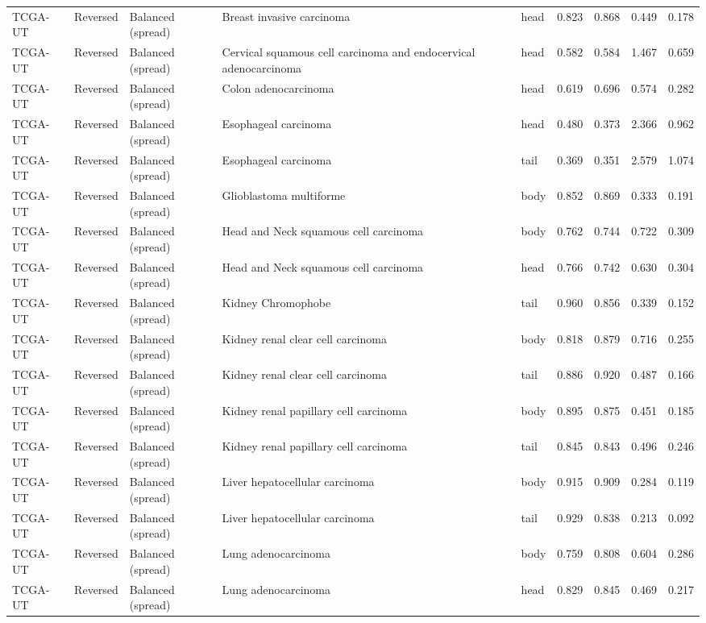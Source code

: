 \begin{longtable}{lllllrrrr}
TCGA-UT & Reversed & Balanced (spread) & Breast invasive carcinoma & head & 0.823 & 0.868 & 0.449 & 0.178 \\
TCGA-UT & Reversed & Balanced (spread) & Cervical squamous cell carcinoma and endocervical adenocarcinoma & head & 0.582 & 0.584 & 1.467 & 0.659 \\
TCGA-UT & Reversed & Balanced (spread) & Colon adenocarcinoma & head & 0.619 & 0.696 & 0.574 & 0.282 \\
TCGA-UT & Reversed & Balanced (spread) & Esophageal carcinoma & head & 0.480 & 0.373 & 2.366 & 0.962 \\
TCGA-UT & Reversed & Balanced (spread) & Esophageal carcinoma & tail & 0.369 & 0.351 & 2.579 & 1.074 \\
TCGA-UT & Reversed & Balanced (spread) & Glioblastoma multiforme & body & 0.852 & 0.869 & 0.333 & 0.191 \\
TCGA-UT & Reversed & Balanced (spread) & Head and Neck squamous cell carcinoma & body & 0.762 & 0.744 & 0.722 & 0.309 \\
TCGA-UT & Reversed & Balanced (spread) & Head and Neck squamous cell carcinoma & head & 0.766 & 0.742 & 0.630 & 0.304 \\
TCGA-UT & Reversed & Balanced (spread) & Kidney Chromophobe & tail & 0.960 & 0.856 & 0.339 & 0.152 \\
TCGA-UT & Reversed & Balanced (spread) & Kidney renal clear cell carcinoma & body & 0.818 & 0.879 & 0.716 & 0.255 \\
TCGA-UT & Reversed & Balanced (spread) & Kidney renal clear cell carcinoma & tail & 0.886 & 0.920 & 0.487 & 0.166 \\
TCGA-UT & Reversed & Balanced (spread) & Kidney renal papillary cell carcinoma & body & 0.895 & 0.875 & 0.451 & 0.185 \\
TCGA-UT & Reversed & Balanced (spread) & Kidney renal papillary cell carcinoma & tail & 0.845 & 0.843 & 0.496 & 0.246 \\
TCGA-UT & Reversed & Balanced (spread) & Liver hepatocellular carcinoma & body & 0.915 & 0.909 & 0.284 & 0.119 \\
TCGA-UT & Reversed & Balanced (spread) & Liver hepatocellular carcinoma & tail & 0.929 & 0.838 & 0.213 & 0.092 \\
TCGA-UT & Reversed & Balanced (spread) & Lung adenocarcinoma & body & 0.759 & 0.808 & 0.604 & 0.286 \\
TCGA-UT & Reversed & Balanced (spread) & Lung adenocarcinoma & head & 0.829 & 0.845 & 0.469 & 0.217 \\

\end{longtable}
